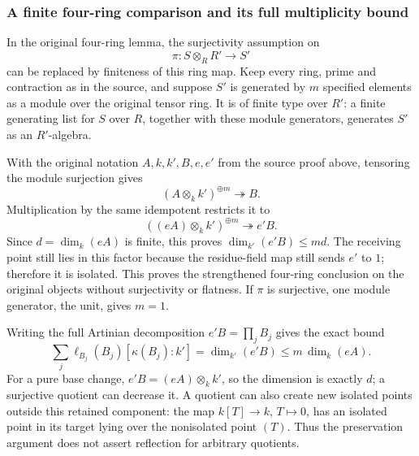 \subsubsection{A finite four-ring comparison and its full multiplicity bound}\label{a-finite-four-ring-comparison-and-its-full-multiplicity-bound}

In the original four-ring lemma, the surjectivity assumption on \[
 \pi:S\otimes_RR'\longrightarrow S'
\] can be replaced by finiteness of this ring map. Keep every ring, prime and contraction as in the source, and suppose \(S'\) is generated by \(m\) specified elements as a module over the original tensor ring. It is of finite type over \(R'\): a finite generating list for \(S\) over \(R\), together with these module generators, generates \(S'\) as an \(R'\)-algebra.

With the original notation \(A,k,k',B,e,e'\) from the source proof above, tensoring the module surjection gives \[
 (A\otimes_k k')^{\oplus m}\twoheadrightarrow B.
\] Multiplication by the same idempotent restricts it to \[
 ((eA)\otimes_k k')^{\oplus m}\twoheadrightarrow e'B.
\] Since \(d=\dim_k(eA)\) is finite, this proves \(\dim_{k'}(e'B)\le md\). The receiving point still lies in this factor because the residue-field map still sends \(e'\) to \(1\); therefore it is isolated. This proves the strengthened four-ring conclusion on the original objects without surjectivity or flatness. If \(\pi\) is surjective, one module generator, the unit, gives \(m=1\).

Writing the full Artinian decomposition \(e'B=\prod_j B_j\) gives the exact bound \[
 \sum_j\ell_{B_j}(B_j)[\kappa(B_j):k']
       =\dim_{k'}(e'B)\le m\,\dim_k(eA).
\] For a pure base change, \(e'B=(eA)\otimes_k k'\), so the dimension is exactly \(d\); a surjective quotient can decrease it. A quotient can also create new isolated points outside this retained component: the map \(k[T]\to k\), \(T\mapsto0\), has an isolated point in its target lying over the nonisolated point \((T)\). Thus the preservation argument does not assert reflection for arbitrary quotients.

